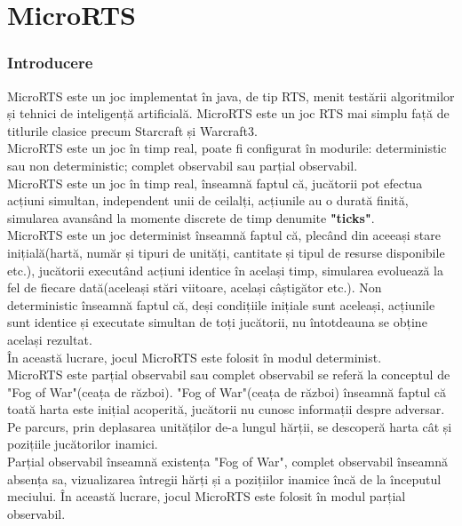 \chapter{MicroRTS}
\subsection{Introducere}
MicroRTS este un joc implementat în java, de tip RTS, menit testării algoritmilor și tehnici de inteligență artificială. MicroRTS este un joc RTS mai simplu față de titlurile clasice precum Starcraft și Warcraft3.\\
MicroRTS este un joc în timp real, poate fi configurat în modurile: deterministic sau non deterministic; complet observabil sau parțial observabil.\\
MicroRTS este un joc în timp real, înseamnă faptul că, jucătorii pot efectua acțiuni simultan, independent unii de ceilalți, acțiunile au o durată finită, simularea avansând la momente discrete de timp denumite \textbf{"ticks"}.\\
MicroRTS este un joc determinist înseamnă faptul că, plecând din aceeași stare inițială(hartă, număr și tipuri de unități, cantitate și tipul de resurse disponibile etc.), jucătorii executând acțiuni identice în același timp, simularea evoluează la fel de fiecare dată(aceleași stări viitoare, același câștigător etc.). Non deterministic înseamnă faptul că, deși condițiile inițiale sunt aceleași, acțiunile sunt identice și executate simultan de toți jucătorii, nu întotdeauna se obține același rezultat.\\
În această lucrare, jocul MicroRTS este folosit în modul determinist.\\
MicroRTS este parțial observabil sau complet observabil se referă la conceptul de "Fog of War"(ceața de război). "Fog of War"(ceața de război) înseamnă faptul că toată harta este inițial acoperită, jucătorii nu cunosc informații despre adversar. Pe parcurs, prin deplasarea unităților de-a lungul hărții, se descoperă harta cât și pozițiile jucătorilor inamici.\\
Parțial observabil înseamnă existența "Fog of War", complet observabil înseamnă absența sa, vizualizarea întregii hărți și a pozițiilor inamice încă de la începutul meciului.
În această lucrare, jocul MicroRTS este folosit în modul parțial observabil.

\subsection{}
